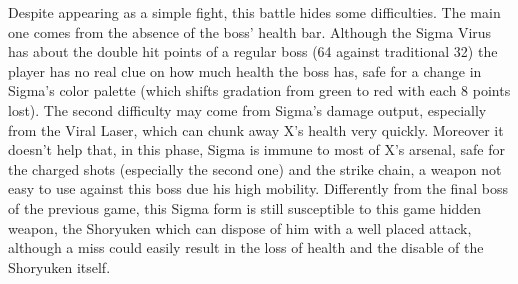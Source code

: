 Despite appearing as a simple fight, this battle hides some difficulties. The main one comes from the absence of the boss' health bar. Although the Sigma Virus has about the double hit points of a regular boss (64 against traditional 32) the player has no real clue on how much health the boss has, safe for a change in Sigma's color palette (which shifts gradation from green to red with each 8 points lost). The second difficulty may come from Sigma's damage output, especially from the Viral Laser, which can chunk away X's health very quickly. Moreover it doesn't help that, in this phase, Sigma is immune to most of X's arsenal, safe for the charged shots (especially the second one) and the strike chain, a weapon not easy to use against this boss due his high mobility. Differently from the final boss of the previous game, this Sigma form is still susceptible to this game hidden weapon, the Shoryuken which can dispose of him with a well placed attack, although a miss could easily result in the loss of health and the disable of the Shoryuken itself.
